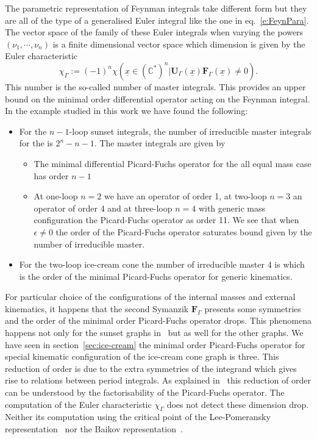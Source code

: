 \documentclass[a4paper,12pt]{article}
\numberwithin{equation}{section}
\numberwithin{figure}{subsection}
\theoremstyle{plain}
\theoremstyle{plain}
\theoremstyle{definition}
\theoremstyle{plain}
\theoremstyle{remark}
\theoremstyle{plain}
\begin{document}
The parametric representation of Feynman integrals take different form
but they are all of the type of a generalised Euler integral like the
one in eq.~\eqref{e:FeynPara}. The vector space of the family of these
Euler integrals when varying the powers $(\nu_1,\cdots,\nu_n)$ is a
finite dimensional vector space which dimension is given by the Euler
characteristic~\cite{Lee:2013hzt,Bitoun:2017nre,Agostini:2022cgv}
\begin{equation}\label{e:chiGamma}
  \chi_\Gamma:=(-1)^n \chi\left(\underline x\in(\mathbb C^*)^n|
  \textbf{U}_\Gamma(\underline x)\textbf{F}_\Gamma(\underline
  x)\neq0\right).
\end{equation} This number is the so-called number of master
integrals. This provides an upper bound on the minimal order
differential operator acting on the Feynman integral. In the example
studied in this work we have found the following:

\begin{itemize}
\item  For the $n-1$-loop
  sunset integrals, the number of irreducible master integrals for the
  is $2^{n}-n-1$.  The master integrals are given by
  
\begin{itemize}  \item The minimal differential Picard-Fuchs operator for the all
    equal mass case has order  $n-1$
  \item At one-loop $n=2$ we have an operator of order 1, at two-loop
    $n=3$ an operator of order 4 and at three-loop $n=4$ with generic
    mass configuration the Picard-Fuchs operator
as   order 11.  We see that when $\epsilon\neq0$  the order of the
    Picard-Fuchs operator saturates bound given by the number of
    irreducible master.
  \end{itemize}
  \item For the two-loop ice-cream cone the number of irreducible
    master 4 is which is the order of the minimal Picard-Fuchs
    operator for generic kinematics.
  \end{itemize}

For particular choice of the configurations of the internal masses and
external kinematics, it happens that the second Symanzik
$\textbf{F}_\Gamma$ presents some symmetries and the order of the
minimal order Picard-Fuchs operator drops.  This phenomena happens not
only for  the sunset graphs
in~\cite{Bloch:2014qca,Lairez:2022zkj,Bonisch:2021yfw,Bonisch:2020qmm,Pogel:2022vat}
but as well for the other graphs. We have seen in section~\ref{sec:ice-cream} the minimal order Picard-Fuchs
operator for special kinematic configuration of the ice-cream cone
graph is three.
This reduction of order is due to the extra symmetries of the
integrand which gives rise to relations between period integrals.
As explained in~\cite{Lairez:2022zkj} this reduction of order can be
understood by the factorisability of the Picard-Fuchs operator.  The
computation of the Euler characteristic $\chi_\Gamma$ does not detect
these dimension drop. Neither its computation using the critical point
of the
Lee-Pomeransky representation~\cite{Lee:2013hzt}   nor the
Baikov representation~\cite{Frellesvig:2017aai,Frellesvig:2019uqt,Cacciatori:2021nli}.
\end{document}
